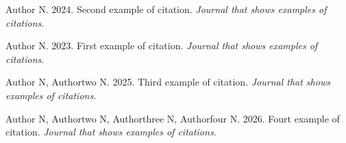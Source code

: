 \documentclass[
]{article}
\newlength{\cslhangindent}
\newlength{\cslentryspacingunit} %
\newenvironment{CSLReferences}[2] %
 {%
  \setlength{\parindent}{0pt}
  \ifodd #1
  \let\oldpar\par
  \def\par{\hangindent=\cslhangindent\oldpar}
  \fi
  \setlength{\parskip}{#2\cslentryspacingunit}
 }%
 {}
\begin{document}
\hypertarget{refs}{}
\begin{CSLReferences}{1}{0}
\leavevmode{}%
Author N. 2024. Second example of citation. \emph{Journal that shows examples of citations}.

\leavevmode{}%
Author N. 2023. First example of citation. \emph{Journal that shows examples of citations}.

\leavevmode{}%
Author N, Authortwo N. 2025. Third example of citation. \emph{Journal that shows examples of citations}.

\leavevmode{}%
Author N, Authortwo N, Authorthree N, Authorfour N. 2026. Fourt example of citation. \emph{Journal that shows examples of citations}.

\end{CSLReferences}
\end{document}
